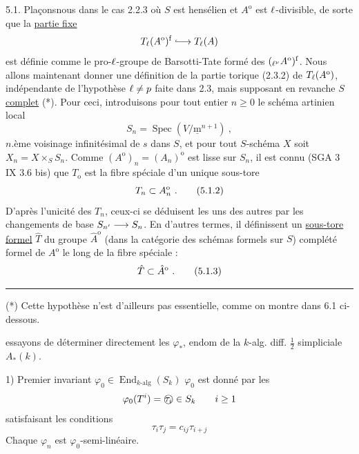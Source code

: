 5.1. Plaçons\unsure{-|\,}nous dans le cas 2.2.3 où $S$ est hensélien et $A^{\mathrm o}$ est $\ell$-divisible, de sorte que la \uline{partie fixe}
\[
T_{\handwritten{\ell}}(A^{\mathrm o})^{\mathrm f}\handwritten{\lhook\joinrel\longrightarrow}T_{\handwritten{\ell}}(A)
\]
est définie comme le pro-$\ell$-groupe de Barsotti-Tate formé des $({}_{\ell^\nu}A^{\mathrm o})^{\mathrm f}$. Nous allons maintenant donner une définition de la partie torique (2.3.2) de $T_{\ell}(A^{\mathrm o})$, indépendante de l'hypothèse $\ell\ne p$ faite dans 2.3, mais supposant en revanche $S$ \uline{complet} (*). Pour ceci, introduisons pour tout entier $n\geq0$ le schéma artinien local
\[
S_n=\operatorname{Spec}(V/\underline{\mathrm m}^{n+1})\ ,\tag*{(5.1.1)}
\]
$n$.ème voisinage infinitésimal de $s$ dans $S$, et pour tout $S$-schéma $X$ soit $X_n=X\times_S S_n$. Comme $(A^{\mathrm o})_n=(A_n)^{\mathrm o}$ est lisse sur $S_n$, il est connu (SGA 3 IX 3.6 bis) que $T_{\mathrm o}$ est la fibre spéciale d'un unique sous-tore
\[
T_n\handwritten{\subset}A_n^{\mathrm o}\ .\tag*{(5.1.2)}
\]
D'après l'unicité des $T_n$, ceux-ci se déduisent les uns des autres par les changements de base $S_{n'}\longrightarrow S_n$. En d'autres termes, il définissent un \uline{sous-tore formel} $\hat T$ du groupe $\hat A^{\mathrm o}$ (dans la catégorie des schémas formels sur $S$) complété formel de $A^{\mathrm o}$ le long de la fibre spéciale :
\[
\hat T\subset\hat A^{\mathrm o}\ .\tag*{(5.1.3)}
\]
\noindent\rule{6em}{.4pt}\par
(*) Cette hypothèse n'est d'ailleurs pas essentielle, comme on montre dans 6.1 ci-dessous.

essayons de déterminer directement les $\varphi_\ast$, endom de la $k$-alg. diff. $\frac12$ simpliciale $A_\ast(k)$.

1) Premier invariant $\varphi_0\in\operatorname{End}_{k\text{-alg}}(S_k)$
\margin{$\begin{gathered}\checkmark\\ -\\ \cdot\\ -\\ \cdot\end{gathered}$}
 $\varphi_0$ est donné par les
\[
\varphi_0(T^i)=\text{\textcircled{$\tau_i$}}\in S_k\qquad i\geq1
\]
satisfaisant les conditions
\[
\boxed{\tau_i\tau_j=c_{ij}\tau_{i+j}}
\]
Chaque $\varphi_n$ est $\varphi_0$-semi-linéaire.

